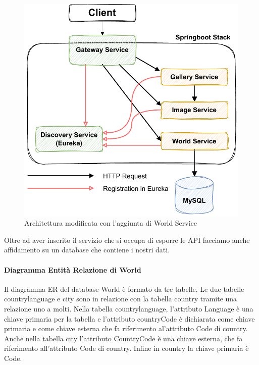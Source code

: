 \begin{figure}[h]
    \centering
    \includegraphics[scale=0.65]{capitoli/immagini/16_architettura_world.pdf}
    \caption{Architettura modificata con l'aggiunta di World Service}
    \label{fig:new_architecture}
\end{figure}

Oltre ad aver inserito il servizio che si occupa di esporre le API facciamo anche affidamento su un database che contiene i nostri dati.

\paragraph{Diagramma Entità Relazione di World}
Il diagramma ER del database World è formato da tre tabelle. Le due tabelle countrylanguage e city sono in relazione con la tabella country tramite una relazione uno a molti.
Nella tabella countrylanguage, l'attributo Language è una chiave primaria per la tabella e l'attributo countryCode è dichiarata come chiave primaria e come chiave esterna che fa riferimento al'attributo Code di country. Anche nella tabella city l'attributo CountryCode è una chiave esterna, che fa riferimento all'attributo Code di country. Infine in country la chiave primaria è Code.

